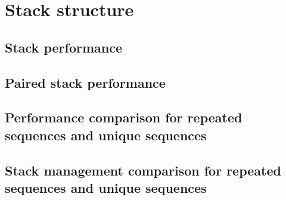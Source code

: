 \section{Stack structure}
\label{SECTION:STACK_STRUCTURE}
\subsection{Stack performance}
\subsection{Paired stack performance}
\subsection{Performance comparison for repeated sequences and unique sequences}
\subsection{Stack management comparison for repeated sequences and unique sequences}
